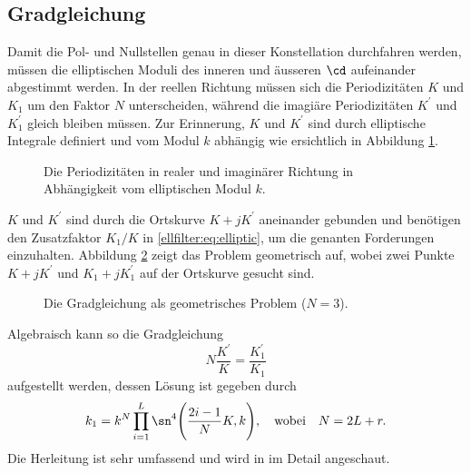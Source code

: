 \subsection{Gradgleichung}

Damit die Pol- und Nullstellen genau in dieser Konstellation durchfahren werden, müssen die elliptischen Moduli des inneren und äusseren $\cd$ aufeinander abgestimmt werden.
In der reellen Richtung müssen sich die Periodizitäten $K$ und $K_1$ um den Faktor $N$ unterscheiden, während die imagiäre Periodizitäten $K^\prime$ und $K^\prime_1$ gleich bleiben müssen.
Zur Erinnerung, $K$ und $K^\prime$ sind durch elliptische Integrale definiert und vom Modul $k$ abhängig wie ersichtlich in Abbildung \ref{ellfilter:fig:kprime}.
\begin{figure}
    \centering
    
    \caption{Die Periodizitäten in realer und imaginärer Richtung in Abhängigkeit vom elliptischen Modul $k$.}
    \label{ellfilter:fig:kprime}
\end{figure}
$K$ und $K^\prime$ sind durch die Ortskurve $K + jK^\prime$ aneinander gebunden und benötigen den Zusatzfaktor $K_1/K$ in \eqref{ellfilter:eq:elliptic}, um die genanten Forderungen einzuhalten.
Abbildung \ref{ellfilter:fig:degree_eq} zeigt das Problem geometrisch auf, wobei zwei Punkte $K+jK^\prime$ und $K_1+jK_1^\prime$ auf der Ortskurve gesucht sind.
\begin{figure}
    \centering
    
    \caption{Die Gradgleichung als geometrisches Problem ($N=3$).}
    \label{ellfilter:fig:degree_eq}
\end{figure}
Algebraisch kann so die Gradgleichung
\begin{equation}
    N \frac{K^\prime}{K} = \frac{K^\prime_1}{K_1}
\end{equation}
aufgestellt werden, dessen Lösung ist gegeben durch
\begin{equation} %
k_1 = k^N \prod_{i=1}^L \sn^4 \Bigg( \frac{2i - 1}{N} K, k \Bigg),
\quad \text{wobei} \quad
N = 2L+r.
\end{equation}
Die Herleitung ist sehr umfassend und wird in \cite{ellfilter:bib:orfanidis} im Detail angeschaut.

%     


